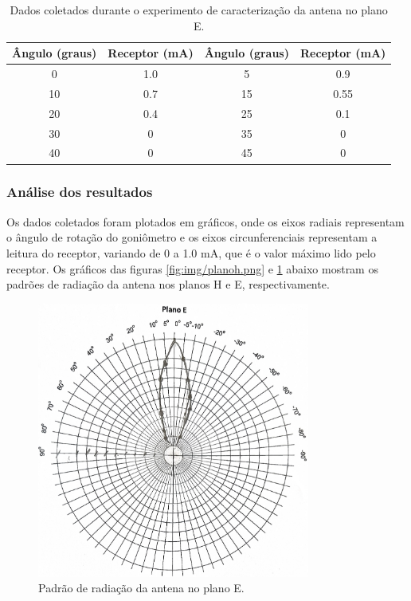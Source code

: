 \documentclass[12pt]{article}
\begin{document}
\begin{table}[H]
  \centering
  \begin{tabular}{|c|c|c|c|}
    \hline
    Ângulo (graus) & Receptor (mA) & Ângulo (graus) & Receptor (mA)\\
    \hline
    0 & 1.0 & 5 & 0.9 \\
    10 & 0.7 & 15 & 0.55 \\
    20 & 0.4 & 25 & 0.1 \\
    30 & 0 & 35 & 0 \\
    40 & 0 & 45 & 0 \\
    \hline
  \end{tabular}
  \caption{Dados coletados durante o experimento de caracterização da
  antena no plano E.}
  \label{tab:caracterizacaoantenaplanoe}
\end{table}

\subsubsection{Análise dos resultados}

Os dados coletados foram plotados em gráficos, onde os eixos radiais
representam o ângulo de rotação do goniômetro e os eixos circunferenciais
representam a leitura do receptor, variando de 0 a 1.0 mA, que é o
valor máximo lido pelo receptor. Os gráficos das figuras
\ref{fig:img/planoh.png}
e \ref{fig:img/planoe.png} abaixo mostram os padrões de radiação da
antena nos planos H e E, respectivamente.

\begin{figure}[H]
  \centering
  \includegraphics[width=0.8\textwidth]{img/planoe.png}
  \caption{Padrão de radiação da antena no plano E.}
  \label{fig:img/planoe.png}
\end{figure}
\end{document}
